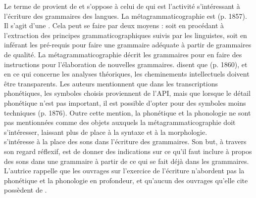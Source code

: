 Le terme de  provient de \textcite{lehmannGrammaticography2004} et s'oppose à celui de  qui est l'activité s'intéressant à l'écriture des grammaires des langues. La métagrammaticographie est  (p. 1857). Il s'agit d'une  \parencite[p. 94]{barabyGrammaticographieLanguesMinoritaires2011}. Cela peut se faire par deux moyens : soit en procédant à l'extraction des principes grammaticographiques suivis par les linguistes, soit en inférant les pré-requis pour faire une grammaire adéquate à partir de grammaires de qualité.
La métagrammaticographie décrit les grammaires pour en faire des instructions pour l'élaboration de nouvelles grammaires. 
\citeauthor{lehmannGrammaticography2004} disent que  (p. 1860), et en ce qui concerne les analyses théoriques, les cheminements intellectuels doivent être transparents.
Les auteurs mentionnent que dans les transcriptions phonétiques, les symboles choisis proviennent de l'API, mais que lorsque le détail phonétique n'est pas important, il est possible d'opter pour des symboles moins techniques (p. 1876). Outre cette mention, la phonétique et la phonologie ne sont pas mentionnées comme des objets auxquels la métagrammaticographie doit s'intéresser, laissant plus de place à la syntaxe et à la morphologie.\\

\textcite{riceSoundsGrammarWriting2014} s'intéresse à la place des sons dans l'écriture des grammaires. Son but, à travers son regard réflexif, est de donner des indications sur ce qu'il faut inclure à propos des sons dans une grammaire à partir de ce qui se fait déjà dans les grammaires. L'autrice rappelle que les ouvrages sur l'exercice de l'écriture n'abordent pas la phonétique et la phonologie en profondeur, et qu'aucun des ouvrages qu'elle cite possèdent de  \parencite[72]{riceSoundsGrammarWriting2014}.\\

